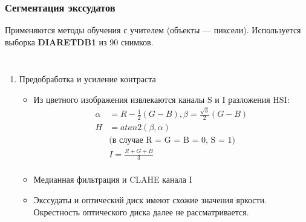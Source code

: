 \documentclass{beamer}
\begin{document}
\begin{frame}
	\frametitle{Сегментация экссудатов}
	{\small Применяются методы обучения с учителем (объекты --- пиксели). Используется выборка \textbf{DIARETDB1} из 90 снимков.}
	
	
	\begin{columns}[c]
		
		\begin{enumerate}
			\footnotesize
			\setcounter{enumi}{0}
			\item Предобработка и усиление контраста
			\begin{itemize}
				\item Из цветного изображения извлекаются каналы S и I разложения HSI:
				\begin{equation}
				\begin{split}
					\alpha &= R - \frac{1}{2} (G - B), \beta = \frac{\sqrt{3}}{2} (G - B)\\
					H &= atan2(\beta, \alpha)\\ \nonumber
					&\text{(в случае R = G = B = 0, S = 1})\\
					&I = \frac{R + G + B}{3}\\
				\end{split}
				\end{equation}
				\item Медианная фильтрация и CLAHE канала I
				\item Экссудаты и оптический диск имеют схожие значения яркости. Окрестность оптического диска далее не рассматривается.
			\end{itemize}
			\normalsize
		\end{enumerate}
		
	\end{columns}
\end{frame}

\end{document}
